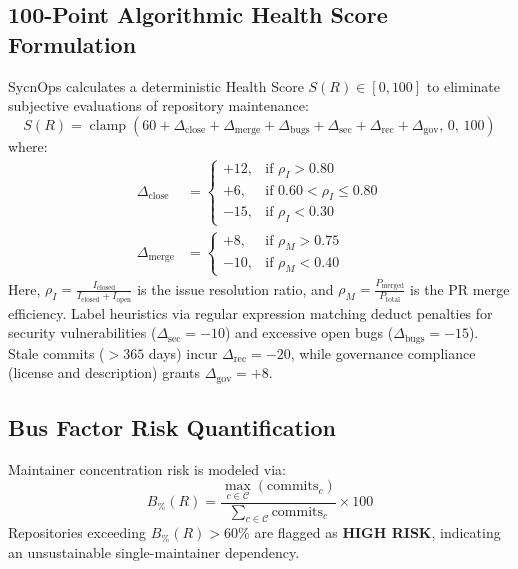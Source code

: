 \documentclass[conference]{IEEEtran}
\begin{document}
\subsection{100-Point Algorithmic Health Score Formulation}
SycnOps calculates a deterministic Health Score $S(R) \in [0, 100]$ to eliminate subjective evaluations of repository maintenance:
\begin{equation}
S(R) = \operatorname{clamp}\left(60 + \Delta_{\text{close}} + \Delta_{\text{merge}} + \Delta_{\text{bugs}} + \Delta_{\text{sec}} + \Delta_{\text{rec}} + \Delta_{\text{gov}},\, 0,\, 100\right)
\end{equation}
where:
\begin{align}
\Delta_{\text{close}} &= \begin{cases} +12, & \text{if } \rho_I > 0.80 \\ +6, & \text{if } 0.60 < \rho_I \le 0.80 \\ -15, & \text{if } \rho_I < 0.30 \end{cases} \\
\Delta_{\text{merge}} &= \begin{cases} +8, & \text{if } \rho_M > 0.75 \\ -10, & \text{if } \rho_M < 0.40 \end{cases}
\end{align}
Here, $\rho_I = \frac{I_{\text{closed}}}{I_{\text{closed}} + I_{\text{open}}}$ is the issue resolution ratio, and $\rho_M = \frac{P_{\text{merged}}}{P_{\text{total}}}$ is the PR merge efficiency. Label heuristics via regular expression matching deduct penalties for security vulnerabilities ($\Delta_{\text{sec}} = -10$) and excessive open bugs ($\Delta_{\text{bugs}} = -15$). Stale commits ($>365$ days) incur $\Delta_{\text{rec}} = -20$, while governance compliance (license and description) grants $\Delta_{\text{gov}} = +8$.

\subsection{Bus Factor Risk Quantification}
Maintainer concentration risk is modeled via:
\begin{equation}
B_{\%}(R) = \frac{\max_{c \in \mathcal{C}} (\text{commits}_c)}{\sum_{c \in \mathcal{C}} \text{commits}_c} \times 100
\end{equation}
Repositories exceeding $B_{\%}(R) > 60\%$ are flagged as \textbf{HIGH RISK}, indicating an unsustainable single-maintainer dependency.
\end{document}

